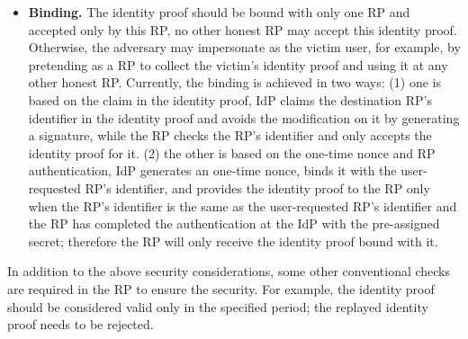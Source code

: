 \begin{itemize}
    \item  \textbf{Binding.} The identity proof should be bound with only one RP and accepted only by this RP, no other honest RP may accept this identity proof. Otherwise, the adversary may impersonate as the victim user, for example, by pretending as a RP to collect the victim's identity proof and using it at any other honest RP. 
        Currently, the binding is achieved in two ways: (1) one is based on the claim in the identity proof, IdP claims the destination RP's identifier in the identity proof and avoids the modification on it by generating a signature, while the RP checks the RP's identifier and only accepts the identity proof for it. (2) the other is based on the one-time nonce and RP authentication, IdP generates an one-time nonce, binds it with the user-requested RP's identifier, and provides the identity proof to the RP only when the RP's identifier is the same as the user-requested RP's identifier and the RP has completed the authentication at the IdP with the pre-assigned secret; therefore the RP will only receive the identity proof bound with it.  
\end{itemize}

In addition to the above security considerations, some other conventional checks are required in the RP to ensure the security. For example, the identity proof should be considered valid only in the specified period; the replayed identity proof needs to be rejected.

